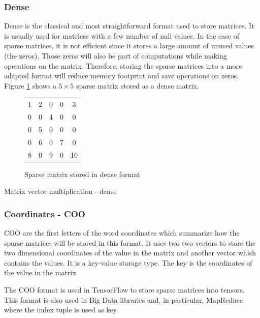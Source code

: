 \subsubsection{Dense}
Dense is the classical and most straightforward format used to store matrices.
It is usually used for matrices with a few number of null values.
In the case of sparse matrices, it is not efficient since it stores a large amount of unused values (the zeros).
Those zeros will also be part of computations while making operations on the matrix.
Therefore, storing the sparse matrices into a more adapted format will reduce memory footprint and save operations on zeros.
Figure \ref{fig:methods:dense_ex} shows a $5 \times 5$ sparse matrix stored as a dense matrix.

\begin{figure}[h]
\centering
\begin{tabular}{|ccccc|}
\hline
1 & 2 & 0 & 0 & 3 \\
0 & 0 & 4 & 0 & 0 \\
0 & 5 & 0 & 0 & 0 \\
0 & 6 & 0 & 7 & 0 \\
8 & 0 & 9 & 0 & 10 \\
\hline
\end{tabular}
\caption{Sparse matrix stored in dense format \label{fig:methods:dense_ex}}
\end{figure}

\begin{algorithm}[h]
	\DontPrintSemicolon
	\caption{Matrix vector multiplication - dense\label{fig:methods:dense_algo}}
\end{algorithm}

\subsubsection{Coordinates - COO}
COO are the first letters of the word coordinates which summarize how the sparse matrices will be stored in this format.
It uses two two vectors to store the two dimensional coordinates of the value in the matrix and another vector which contains the values.
It is a key-value storage type.
The key is the coordinates of the value in the matrix.

The COO format is used in TensorFlow to store sparse matrices into tensors.
This format is also used in Big Data libraries and, in particular, MapReduce \cite{DeanG2004} where the index tuple is used as key.

